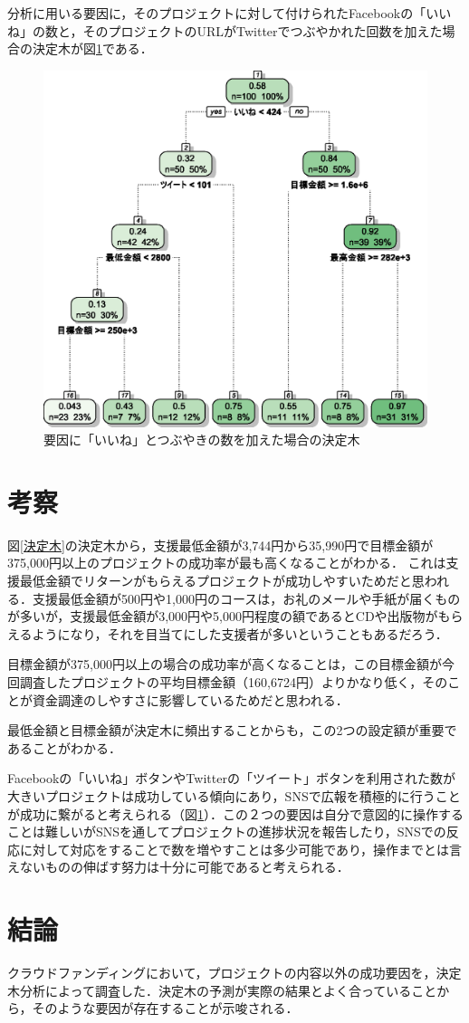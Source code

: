 \documentclass[uplatex,twocolumn]{jsarticle}
\begin{document}
分析に用いる要因に，そのプロジェクトに対して付けられたFacebookの「いいね」の数と，そのプロジェクトのURLがTwitterでつぶやかれた回数を加えた場合の決定木が図\ref{決定木2}である．

\begin{figure}[htb]
\centering
\includegraphics[width=.8\columnwidth,clip]{figure2.eps}
\caption{要因に「いいね」とつぶやきの数を加えた場合の決定木}\label{決定木2}
\end{figure}

\section{考察}

図\ref{決定木}の決定木から，支援最低金額が3,744円から35,990円で目標金額が375,000円以上のプロジェクトの成功率が最も高くなることがわかる．
これは支援最低金額でリターンがもらえるプロジェクトが成功しやすいためだと思われる．支援最低金額が500円や1,000円のコースは，お礼のメールや手紙が届くものが多いが，支援最低金額が3,000円や5,000円程度の額であるとCDや出版物がもらえるようになり，それを目当てにした支援者が多いということもあるだろう．

目標金額が375,000円以上の場合の成功率が高くなることは，この目標金額が今回調査したプロジェクトの平均目標金額（160,6724円）よりかなり低く，そのことが資金調達のしやすさに影響しているためだと思われる．

最低金額と目標金額が決定木に頻出することからも，この2つの設定額が重要であることがわかる．

Facebookの「いいね」ボタンやTwitterの「ツイート」ボタンを利用された数が大きいプロジェクトは成功している傾向にあり，SNSで広報を積極的に行うことが成功に繋がると考えられる（図\ref{決定木2}）．この２つの要因は自分で意図的に操作することは難しいがSNSを通してプロジェクトの進捗状況を報告したり，SNSでの反応に対して対応をすることで数を増やすことは多少可能であり，操作までとは言えないものの伸ばす努力は十分に可能であると考えられる．

\section{結論}
クラウドファンディングにおいて，プロジェクトの内容以外の成功要因を，決定木分析によって調査した．決定木の予測が実際の結果とよく合っていることから，そのような要因が存在することが示唆される．


\small
\end{document}
